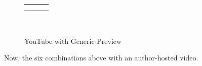 \documentclass[10pt,]{article}
\theoremstyle{plain}
\theoremstyle{definition}
\theoremstyle{definition}
\theoremstyle{definition}
\theoremstyle{definition}
\theoremstyle{definition}
\theoremstyle{definition}
\numberwithin{equation}{section}
\newlength{\panelmax}
\begin{document}
\begin{figure}
{\begin{tabular}{@{}*{3}{c}@{}}
\begin{minipage}[c][\panelmax][t]{0.3\linewidth}\usebox{\panelboxAvideo}\end{minipage}&
\begin{minipage}[c][\panelmax][t]{0.3\linewidth}\usebox{\panelboxBvideo}\end{minipage}&
\begin{minipage}[c][\panelmax][t]{0.3\linewidth}\usebox{\panelboxCvideo}\end{minipage}\tabularnewline
\parbox[t]{0.3\linewidth}{
}&
\parbox[t]{0.3\linewidth}{
}&
\parbox[t]{0.3\linewidth}{
}\end{tabular}\\
}%
\caption{YouTube with Generic Preview\label{figure-36}}
\end{figure}
\hypertarget{p-503}{}%
Now, the six combinations above with an author-hosted video.%
\end{document}
